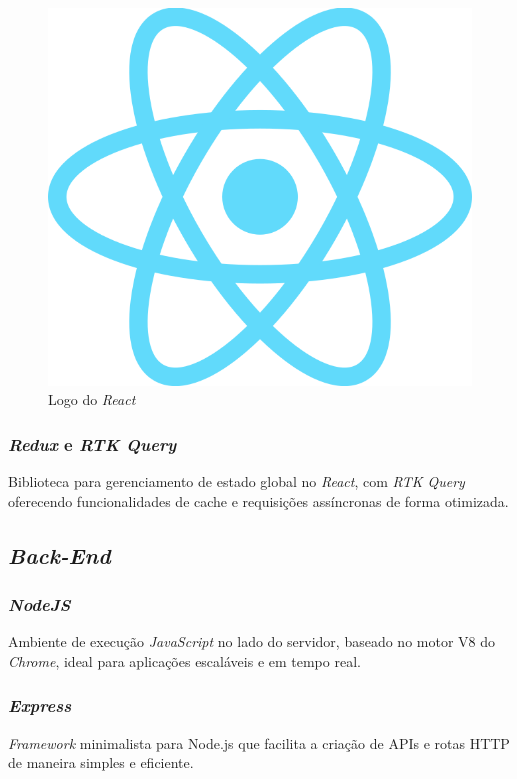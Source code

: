 \begin{figure}[htb]
  \centering
  \includegraphics[width=\textwidth]{cap04-desenvolvimento/images/4-4-1-1-react}
  \caption{Logo do \emph{React}}
  \label{fig:diagrama-implantacao}
\end{figure}

\subsubsection{\emph{Redux} e \emph{RTK Query}} 
Biblioteca para gerenciamento de estado global no \emph{React}, com \emph{RTK Query} oferecendo funcionalidades de cache e requisições assíncronas de forma otimizada.

\subsection{\emph{Back-End}} 

\subsubsection{\emph{NodeJS}} 
Ambiente de execução \emph{JavaScript} no lado do servidor, baseado no motor V8 do \emph{Chrome}, ideal para aplicações escaláveis e em tempo real.

\subsubsection{\emph{Express}} 
\emph{Framework} minimalista para Node.js que facilita a criação de APIs e rotas HTTP de maneira simples e eficiente.

